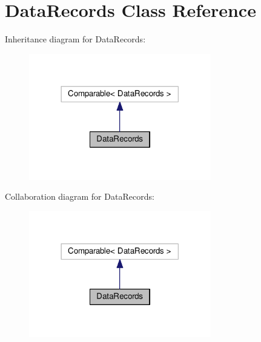 \hypertarget{classDataRecords}{}\section{Data\+Records Class Reference}
\label{classDataRecords}


Inheritance diagram for Data\+Records\+:\nopagebreak
\begin{figure}[H]
\begin{center}
\leavevmode
\includegraphics[width=225pt]{classDataRecords__inherit__graph}
\end{center}
\end{figure}


Collaboration diagram for Data\+Records\+:\nopagebreak
\begin{figure}[H]
\begin{center}
\leavevmode
\includegraphics[width=225pt]{classDataRecords__coll__graph}
\end{center}
\end{figure}
